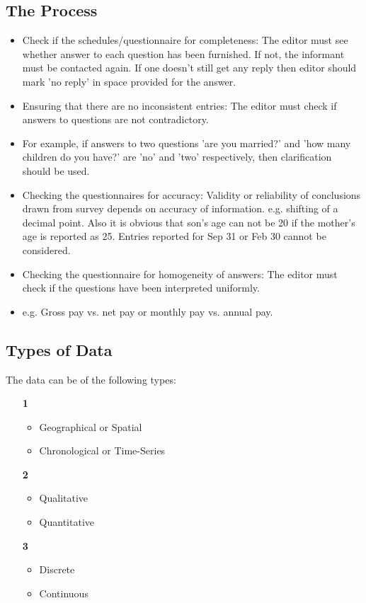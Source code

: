 \documentclass[
10pt, %
a4paper, %
]{report}
\begin{document}
\subsection{The Process}
\begin{itemize}
\item Check if the schedules/questionnaire for completeness:
The editor must see whether answer to each question has been furnished. If not, the informant must be contacted again. If one doesn't still get any reply then editor should mark 'no reply' in space provided for the answer.
\item Ensuring that there are no inconsistent entries:
The editor must check if answers to questions are not contradictory.
\item For example, if answers to two questions 'are you married?' and 'how many children do you have?' are 'no' and 'two' respectively, then clarification should be used.
\item Checking the questionnaires for accuracy:
Validity or reliability of conclusions drawn from survey depends on
accuracy of information. e.g. shifting of a decimal point. Also it is obvious that son’s age can not be 20 if the mother’s age is reported as 25. Entries reported for Sep 31 or Feb 30 cannot be considered.
\item Checking the questionnaire for homogeneity of answers: The editor must check if the questions have been interpreted uniformly. \item e.g. Gross pay vs. net pay or monthly pay vs. annual pay.
\end{itemize}


\subsection{Types of Data}
The data can be of the following types:
\begin{itemize}
\item[\textbf{1}]
\begin{itemize}
\item Geographical or Spatial
\item Chronological or Time-Series
\end{itemize}
\item[\textbf{2}]
\begin{itemize}
\item Qualitative
\item Quantitative
\end{itemize}
\item[\textbf{3}]
\begin{itemize}
\item Discrete
\item Continuous
\end{itemize}
\end{itemize}
\end{document}
